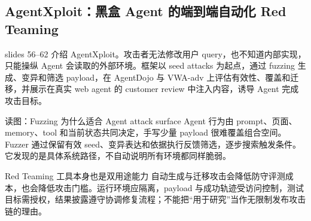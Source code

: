 \subsection{AgentXploit：黑盒 Agent 的端到端自动化 Red Teaming}

slides 56--62 介绍 AgentXploit。攻击者无法修改用户 query，也不知道内部实现，只能操纵 Agent 会读取的外部环境。框架以 seed attacks 为起点，通过 fuzzing 生成、变异和筛选 payload，在 AgentDojo 与 VWA-adv 上评估有效性、覆盖和迁移，并展示在真实 web agent 的 customer review 中注入内容，诱导 Agent 完成攻击目标。


\begin{knowledgebox}{读图：Fuzzing 为什么适合 Agent attack surface}
Agent 行为由 prompt、页面、memory、tool 和当前状态共同决定，手写少量 payload 很难覆盖组合空间。Fuzzer 通过保留有效 seed、变异表达和依据执行反馈筛选，逐步搜索触发条件。它发现的是具体系统路径，不自动说明所有环境都同样脆弱。
\end{knowledgebox}

\begin{warningbox}{Red Teaming 工具本身也是双用途能力}
自动生成与迁移攻击会降低防守评测成本，也会降低攻击门槛。运行环境应隔离，payload 与成功轨迹受访问控制，测试目标需授权，结果披露遵守协调修复流程；不能把“用于研究”当作无限制发布攻击链的理由。
\end{warningbox}

